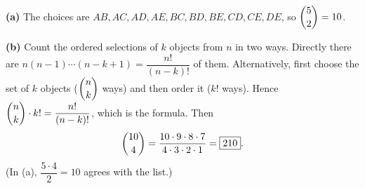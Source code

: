 \textbf{(a)} The choices are $AB,AC,AD,AE,BC,BD,BE,CD,CE,DE$, so $\dbinom52=10$.

\textbf{(b)} Count the ordered selections of $k$ objects from $n$ in two ways. Directly there are $n(n-1)\cdots(n-k+1)=\dfrac{n!}{(n-k)!}$ of them. Alternatively, first choose the set of $k$ objects ($\dbinom nk$ ways) and then order it ($k!$ ways). Hence $\dbinom nk\cdot k!=\dfrac{n!}{(n-k)!}$, which is the formula. Then
\[
\dbinom{10}{4}=\dfrac{10\cdot9\cdot8\cdot7}{4\cdot3\cdot2\cdot1}=\boxed{210}.
\]
(In (a), $\dfrac{5\cdot4}{2}=10$ agrees with the list.)
